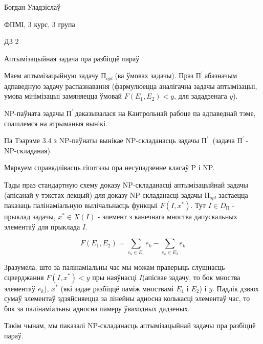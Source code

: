 \documentclass{article}
\newcommand{\opt}{${\text{П}}_{opt}\ $}
\newcommand{\rec}{${\text{П}}^\prime\ $}
\begin{document}
{\large

Богдан Уладзіслаў

ФПМІ, 3 курс, 3 група

\vspace{5mm}

ДЗ 2

Аптымізацыйная задача пра разбіццё параў

}

\vspace{10mm}

Маем аптымізацыйную задачу \opt (ва ўмовах задачы). Праз \rec абазначым
адпаведную задачу распазнавання (фармулюецца аналігачна задачы аптымізацыі,
умова мінімізацыі замяняецца ўмовай $F(E_1, E_2) < y$, для зададзенага $y$).

NP-паўната задачы \rec даказывалася на Кантрольнай рабоце па адпаведнай тэме,
спашлемся на атрыманыя вынікі.

Па Тэарэме 3.4 з NP-паўнаты вынікае NP-складанасць задачы \rec
(задача \rec - NP-складаная).

Мяркуем справядлівасць гіпотэзы пра несупадзенне класаў P і NP.

Тады праз стандартную схему доказу NP-складанасці аптымізацыйнай задачы
(апісанай у тэкстах лекцый) для доказу NP-складанасці задачы \opt застаецца
паказаць палінаміальную вылічальнасць функцыі $F(I, x^{*})$. Тут $I \in D_{\text{П}}$ -
прыклад задачы, $x^{*} \in X(I)$ - элемент з канечнага мноства дапускальных
элементаў для прыклада $I$.

\[
F(E_1, E_2) = \sum_{e_k \in E_1}{e_k} - \sum_{e_k \in E_2}{e_k}
\]

Зразумела, што за палінаміальны час мы можам праверыць слушнасць сцверджання
$F(I, x^{*}) < y$ пры наяўнасці $I$(апісвае задачу, то бок мноства элементаў
$e_k$), $x^{*}$ (які задае разбіццё паміж мноствамі $E_1$ і $E_2$) і $y$. Падлік
дзвюх сумаў элементаў здзяйсняецца за лінейны адносна колькасці элементаў час,
то бок за палінаміальны адносна памеру ўваходных дадзеных.

Такім чынам, мы паказалі NP-складанасць аптымізацыйнай задачы пра разбіццё параў.
\end{document}
